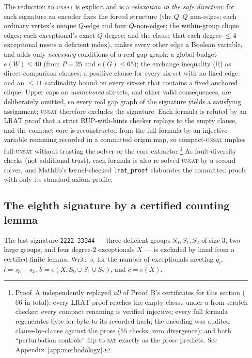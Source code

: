 \documentclass[11pt,reqno]{amsart}
\theoremstyle{definition}
\theoremstyle{remark}
\begin{document}
The reduction to \textsc{unsat} is explicit and is a \emph{relaxation in the safe
direction}: for each signature an encoder fixes the forced structure (the $Q$--$Q$
non-edges; each ordinary vertex's unique $Q$-edge and four $Q$-non-edges; the within-group
clique edges; each exceptional's exact $Q$-degree; and the clause that each degree-$\le 4$
exceptional meets a deficient index), makes every other edge a Boolean variable, and adds
only \emph{necessary} conditions of a real gap graph: a global budget $e(W)\le 40$ (from
$P=25$ and $e(G)\le 65$); the exchange inequality (E) as direct comparison clauses; a
positive clause for every six-set with no fixed edge; and an $\le 11$ cardinality bound on
every six-set that contains a fixed anchored clique. Upper caps on \emph{unanchored}
six-sets, and other valid consequences, are deliberately omitted, so every real gap graph
of the signature yields a satisfying assignment; \textsc{unsat} therefore excludes the
signature. Each formula is refuted by an LRAT proof that a strict RUP-with-hints checker
replays to the empty clause, and the compact core is reconstructed from the full formula
by an injective variable renaming recorded in a committed origin map, so
compact-\textsc{unsat} implies full-\textsc{unsat} without trusting the solver or the core
extractor.\footnote{Proof~A independently replayed \emph{all} of Proof~B's certificates
for this section ($66$ in total): every LRAT proof reaches the empty clause under a
from-scratch checker; every compact renaming is verified injective; every full formula
regenerates byte-for-byte to its recorded hash; the encoding was audited clause-by-clause
against the prose ($55$ checks, zero divergence); and both ``perturbation controls'' flip
to \textsc{sat} exactly as the prose predicts. See Appendix~\ref{app:methodology}.} As
fault-diversity checks (not additional trust), each formula is also re-solved
\textsc{unsat} by a second solver, and Mathlib's kernel-checked \texttt{lrat\_proof}
elaborates the committed proofs with only its standard axiom profile.

\subsection{The eighth signature by a certified counting lemma}
The last signature \texttt{2222\_33344} --- three deficient groups $S_0,S_1,S_2$ of size
$3$, two large groups, and four degree-$2$ exceptionals $X$ --- is excluded by hand from a
certified finite lemma. Write $s_i$ for the number of exceptionals meeting $q_i$,
$l=s_3+s_4$, $b=e(X,S_0\cup S_1\cup S_2)$, and $c=e(X)$.
\end{document}
